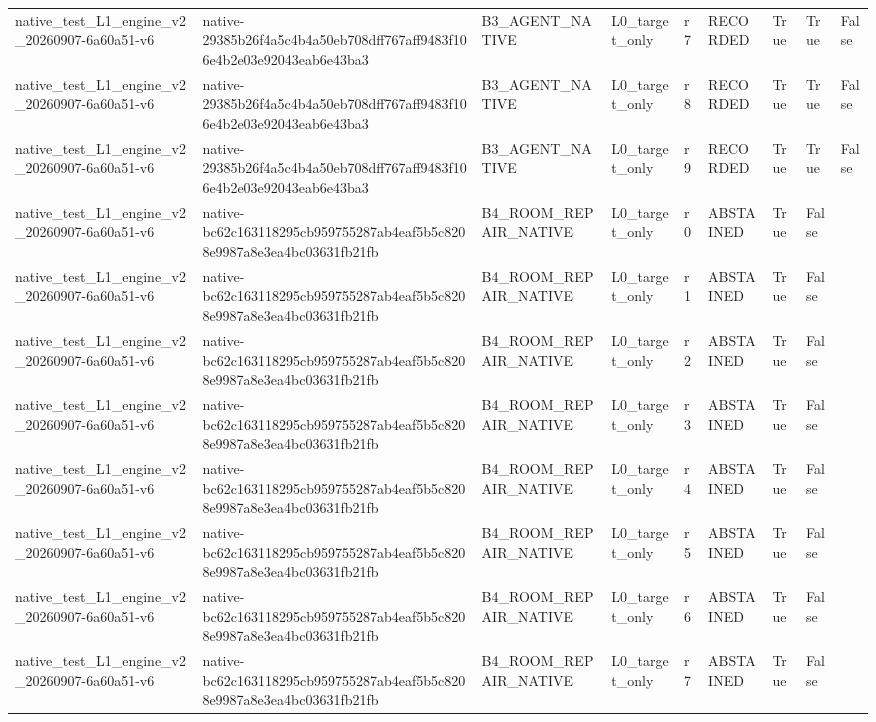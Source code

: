 \begin{tabular}{lllllllll}
native\_test\_L1\_engine\_v2\_20260907-6a60a51-v6 & native-29385b26f4a5c4b4a50eb708dff767aff9483f106e4b2e03e92043eab6e43ba3 & B3\_AGENT\_NATIVE & L0\_target\_only & r7 & RECORDED & True & True & False \\
native\_test\_L1\_engine\_v2\_20260907-6a60a51-v6 & native-29385b26f4a5c4b4a50eb708dff767aff9483f106e4b2e03e92043eab6e43ba3 & B3\_AGENT\_NATIVE & L0\_target\_only & r8 & RECORDED & True & True & False \\
native\_test\_L1\_engine\_v2\_20260907-6a60a51-v6 & native-29385b26f4a5c4b4a50eb708dff767aff9483f106e4b2e03e92043eab6e43ba3 & B3\_AGENT\_NATIVE & L0\_target\_only & r9 & RECORDED & True & True & False \\
native\_test\_L1\_engine\_v2\_20260907-6a60a51-v6 & native-bc62c163118295cb959755287ab4eaf5b5c8208e9987a8e3ea4bc03631fb21fb & B4\_ROOM\_REPAIR\_NATIVE & L0\_target\_only & r0 & ABSTAINED & True & False &  \\
native\_test\_L1\_engine\_v2\_20260907-6a60a51-v6 & native-bc62c163118295cb959755287ab4eaf5b5c8208e9987a8e3ea4bc03631fb21fb & B4\_ROOM\_REPAIR\_NATIVE & L0\_target\_only & r1 & ABSTAINED & True & False &  \\
native\_test\_L1\_engine\_v2\_20260907-6a60a51-v6 & native-bc62c163118295cb959755287ab4eaf5b5c8208e9987a8e3ea4bc03631fb21fb & B4\_ROOM\_REPAIR\_NATIVE & L0\_target\_only & r2 & ABSTAINED & True & False &  \\
native\_test\_L1\_engine\_v2\_20260907-6a60a51-v6 & native-bc62c163118295cb959755287ab4eaf5b5c8208e9987a8e3ea4bc03631fb21fb & B4\_ROOM\_REPAIR\_NATIVE & L0\_target\_only & r3 & ABSTAINED & True & False &  \\
native\_test\_L1\_engine\_v2\_20260907-6a60a51-v6 & native-bc62c163118295cb959755287ab4eaf5b5c8208e9987a8e3ea4bc03631fb21fb & B4\_ROOM\_REPAIR\_NATIVE & L0\_target\_only & r4 & ABSTAINED & True & False &  \\
native\_test\_L1\_engine\_v2\_20260907-6a60a51-v6 & native-bc62c163118295cb959755287ab4eaf5b5c8208e9987a8e3ea4bc03631fb21fb & B4\_ROOM\_REPAIR\_NATIVE & L0\_target\_only & r5 & ABSTAINED & True & False &  \\
native\_test\_L1\_engine\_v2\_20260907-6a60a51-v6 & native-bc62c163118295cb959755287ab4eaf5b5c8208e9987a8e3ea4bc03631fb21fb & B4\_ROOM\_REPAIR\_NATIVE & L0\_target\_only & r6 & ABSTAINED & True & False &  \\
native\_test\_L1\_engine\_v2\_20260907-6a60a51-v6 & native-bc62c163118295cb959755287ab4eaf5b5c8208e9987a8e3ea4bc03631fb21fb & B4\_ROOM\_REPAIR\_NATIVE & L0\_target\_only & r7 & ABSTAINED & True & False &  \\

\end{tabular}
